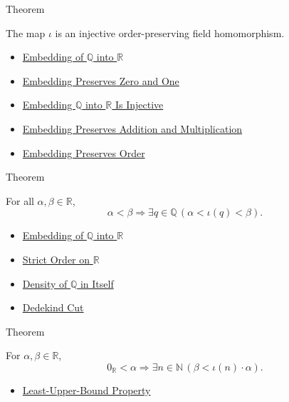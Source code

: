 \begin{theorembox}{Theorem}
\begin{theorem}
\label{thm:q-embeds-into-r}
The map $\iota$ is an injective order-preserving field homomorphism.
\end{theorem}
\end{theorembox}

\begin{dependencies}
\begin{itemize}
  \item \hyperref[def:real-chapter-embedding-q-into-r]{Embedding of $\mathbb{Q}$ into $\mathbb{R}$}
  \item \hyperref[thm:embedding-q-into-r-preserves-zero-one]{Embedding Preserves Zero and One}
  \item \hyperref[thm:embedding-q-into-r-injective]{Embedding $\mathbb{Q}$ into $\mathbb{R}$ Is Injective}
  \item \hyperref[thm:embedding-q-into-r-preserves-arithmetic]{Embedding Preserves Addition and Multiplication}
  \item \hyperref[thm:embedding-q-into-r-preserves-order]{Embedding Preserves Order}
\end{itemize}
\end{dependencies}

\begin{theorembox}{Theorem}
\begin{theorem}
\label{thm:density-of-q-in-r}
For all $\alpha,\beta\in\mathbb{R}$,
\[
\alpha<\beta \Longrightarrow \exists q\in\mathbb{Q}\,(\alpha<\iota(q)<\beta).
\]
\end{theorem}
\end{theorembox}

\begin{dependencies}
\begin{itemize}
  \item \hyperref[def:real-chapter-embedding-q-into-r]{Embedding of $\mathbb{Q}$ into $\mathbb{R}$}
  \item \hyperref[def:strict-order-on-r]{Strict Order on $\mathbb{R}$}
  \item \hyperref[thm:density-of-q]{Density of $\mathbb{Q}$ in Itself}
  \item \hyperref[def:dedekind-cut]{Dedekind Cut}
\end{itemize}
\end{dependencies}

\begin{theorembox}{Theorem}
\begin{theorem}
\label{thm:archimedean-property-of-r}
For $\alpha,\beta\in\mathbb{R}$,
\[
0_{\mathbb{R}}<\alpha
\Longrightarrow
\exists n\in\mathbb{N}\,(\beta<\iota(n)\cdot\alpha).
\]
\end{theorem}
\end{theorembox}

\begin{dependencies}
\begin{itemize}
  \item \hyperref[thm:lub-property-r]{Least-Upper-Bound Property}
\end{itemize}
\end{dependencies}
